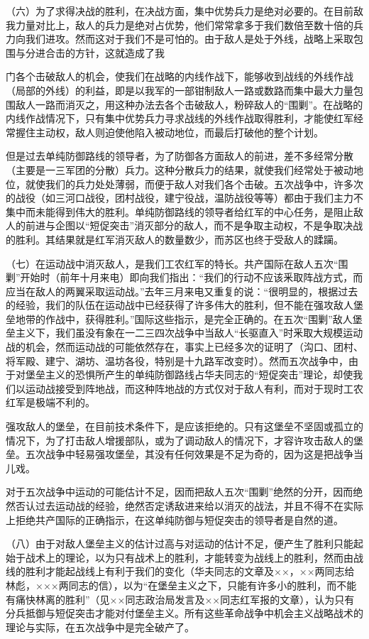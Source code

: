 （六）为了求得决战的胜利，在决战方面，集中优势兵力是绝对必要的。在目前敌我力量对比上，敌人的兵力是绝对占优势，他们常常拿多于我们数倍至数十倍的兵力向我们进攻。然而这对于我们不是可怕的。由于敌人是处于外线，战略上采取包围与分进合击的方针，这就造成了我{门各个击破敌人的机会，使我们在战略的内线作战下，能够收到战线的外线作战（局部的外线）的利益，即是以我军的一部钳制敌人一路或数路而集中最大力量包围敌人一路而消灭之，用这种办法去各个击破敌人，粉碎敌人的“围剿”。在战略的内线作战情况下，只有集中优势兵力寻求战线的外线作战取得胜利，才能使红军经常握住主动权，敌人则迫使他陷入被动地位，而最后打破他的整个计划。

但是过去单纯防御路线的领导者，为了防御各方面敌人的前进，差不多经常分散（主要是一三军团的分散）兵力。这种分散兵力的结果，就使我们经常处于被动地位，就使我们的兵力处处薄弱，而便于敌人对我们各个击破。五次战争中，许多次的战役（如三河口战役，团村战役，建宁役战，温防战役等等）都由于我们主力不集中而未能得到伟大的胜利。单纯防御路线的领导者给红军的中心任务，是阻止敌人的前进与企图以“短促突击”消灭部分的敌人，而不是争取主动权，不是争取决战的胜利。其结果就是红军消灭敌人的数量数少，而苏区也终于受敌人的蹂躏。

（七）在运动战中消灭敌人，是我们工农红军的特长。共产国际在敌人五次“围剿”开始时（前年十月来电）即向我们指出：“我们的行动不应该釆取阵战方式，而应当在敌人的两翼采取运动战。”去年三月来电又重复的说：“很明显的，根据过去的经验，我们的队伍在运动战中已经获得了许多伟大的胜利，但不能在强攻敌人堡垒地带的作战中，获得胜利。”国际这些指示，是完全正确的。在五次“围剿”敌人堡垒主义下，我们虽没有象在一二三四次战争中当敌人“长驱直入”时釆取大规模运动战的机会，然而运动战的可能依然存在，事实上已经多次的证明了（沟口、团村、将军殿、建宁、湖坊、温坊各役，特别是十九路军改变时）。然而五次战争中，由于对堡垒主义的恐惧所产生的单纯防御路线占华夫同志的“短促突击”理论，却使我们以运动战接受到阵地战，而这种阵地战的方式仅对于敌人有利，而对于现时工农红军是极端不利的。

强攻敌人的堡垒，在目前技术条件下，是应该拒绝的。只有这堡垒不坚固或孤立的情况下，为了打击敌人增援部队，或为了调动敌人的情况下，才容许攻击敌人的堡垒。五次战争中轻易强攻堡垒，其没有任何效果是不足为奇的，因为这是把战争当儿戏。

对于五次战争中运动的可能估计不足，因而把敌人五次“围剿”绝然的分开，因而绝然否认过去运动战的经验，绝然否定诱敌进来给以消灭的战法，并且不得不在实际上拒绝共产国际的正确指示，在这单纯防御与短促突击的领导者是自然的道。

（八）由于对敌人堡垒主义的估计过高与对运动的估计不足，便产生了胜利只能起始于战术上的理论，以为只有战术上的胜利，才能转变为战线上的胜利，然而由战线的胜利才能起战线上有利于我们的变化（华夫同志的文章及××，××两同志给林彪，×××两同志的信），以为“在堡垒主义之下，只能有许多小的胜利，而不能有痛快林离的胜利”（见××同志政治局发言及××同志红军报的文章），认为只有分兵抵御与短促突击才能对付堡垒主义。所有这些革命战争中机会主义战略战术的理论与实际，在五次战争中是完全破产了。

}
